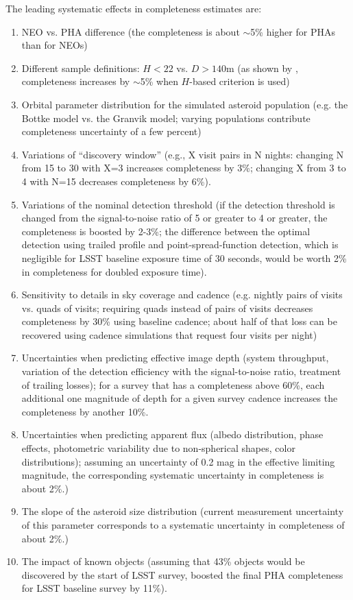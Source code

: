 The leading systematic effects in completeness estimates are: 
\begin{enumerate}
\item NEO vs. PHA difference (the completeness is about $\sim$5\% higher for PHAs than for NEOs) 
\item Different sample definitions: $H<22$ vs. $D>140$m (as shown by \citep{GMS2016}, completeness
           increases by $\sim$5\% when $H$-based criterion is used) 
\item Orbital parameter distribution for the simulated asteroid population (e.g. the Bottke model
             vs. the Granvik model; varying populations contribute completeness uncertainty of a few percent) 
\item Variations of ``discovery window'' (e.g., X visit pairs in N nights: changing N from 15 to 30 with X=3 increases
          completeness by 3\%; changing X from 3 to 4 with N=15 decreases completeness by 6\%). 
\item Variations of the nominal detection threshold (if the detection threshold is changed from the 
          signal-to-noise ratio of 5 or greater to 4 or greater, the completeness is boosted by 2-3\%; 
          the difference between the optimal detection using trailed profile and point-spread-function 
          detection, which is negligible for LSST baseline exposure time of 30 seconds, would be worth 2\%
          in completeness for doubled exposure time). 
\item Sensitivity to details in sky coverage and cadence (e.g. nightly pairs of visits vs. quads of visits;
          requiring quads instead of pairs of visits decreases completeness by 30\% using baseline cadence; 
          about half of that loss can be recovered using cadence simulations that request four visits per night) 
\item Uncertainties when predicting effective image depth (system throughput, variation of the detection efficiency
          with the signal-to-noise ratio, treatment of trailing losses); for a survey that has a completeness above 60\%, 
          each additional one magnitude of depth for a given survey cadence increases the completeness by another 10\%.
\item Uncertainties when predicting apparent flux (albedo distribution, phase effects, photometric variability 
          due to non-spherical shapes, color distributions); assuming an uncertainty of 0.2 mag in the effective 
          limiting magnitude, the corresponding  systematic uncertainty in completeness is about 2\%.)
\item The slope of the asteroid size distribution (current measurement uncertainty of this parameter 
          corresponds to a systematic uncertainty in completeness of about 2\%.)
\item The impact of known objects (assuming that 43\% objects would be discovered by the start of
          LSST survey, \citep{GMS2016} boosted the final PHA completeness for LSST baseline survey by 11\%). 
\end{enumerate} 

